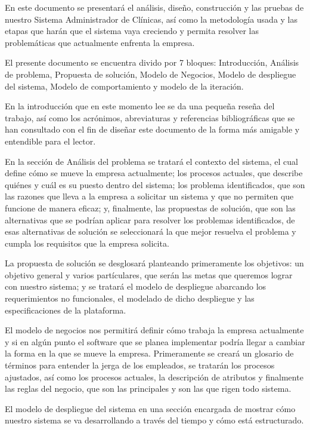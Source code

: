 En este documento se presentará el análisis, diseño, construcción y las pruebas de nuestro Sistema Administrador de Clínicas, así como la metodología usada y las etapas que harán que el sistema vaya creciendo y permita resolver las problemáticas que actualmente enfrenta la empresa.

El presente documento se encuentra divido por 7 bloques: Introducción, Análisis de problema, Propuesta de solución, Modelo de Negocios, Modelo de despliegue del sistema, Modelo de comportamiento y modelo de la iteración.

En la introducción que en este momento lee se da una pequeña reseña del trabajo, así como los acrónimos, abreviaturas y referencias bibliográficas que se han consultado con el fin de diseñar este documento de la forma más amigable y entendible para el lector.

En la sección de Análisis del problema se tratará el contexto del sistema, el cual define cómo se mueve la empresa actualmente; los procesos actuales, que describe quiénes y cuál es su puesto dentro del sistema; los problema identificados, que son las razones que lleva a la empresa a solicitar un sistema y que no permiten que funcione de manera eficaz; y, finalmente, las propuestas de solución, que son las alternativas que se podrían aplicar para resolver los problemas identificados, de esas alternativas de solución se seleccionará la que mejor resuelva el problema y cumpla los requisitos que la empresa solicita.

La propuesta de solución se desglosará planteando primeramente los objetivos: un objetivo general y varios partículares, que serán las metas que queremos lograr con nuestro sistema; y se tratará el modelo de despliegue abarcando los requerimientos no funcionales, el modelado de dicho despliegue y las especificaciones de la plataforma.

El modelo de negocios nos permitirá definir cómo trabaja la empresa actualmente y si en algún punto el software que se planea implementar podría llegar a cambiar la forma en la que se mueve la empresa. Primeramente se creará un glosario de términos para entender la jerga de los empleados, se tratarán los procesos ajustados, así como los procesos actuales, la descripción de atributos y finalmente las reglas del negocio, que son las principales y son las que rigen todo sistema.

El modelo de despliegue del sistema en una sección encargada de mostrar cómo nuestro sistema se va desarrollando a través del tiempo y cómo está estructurado.

